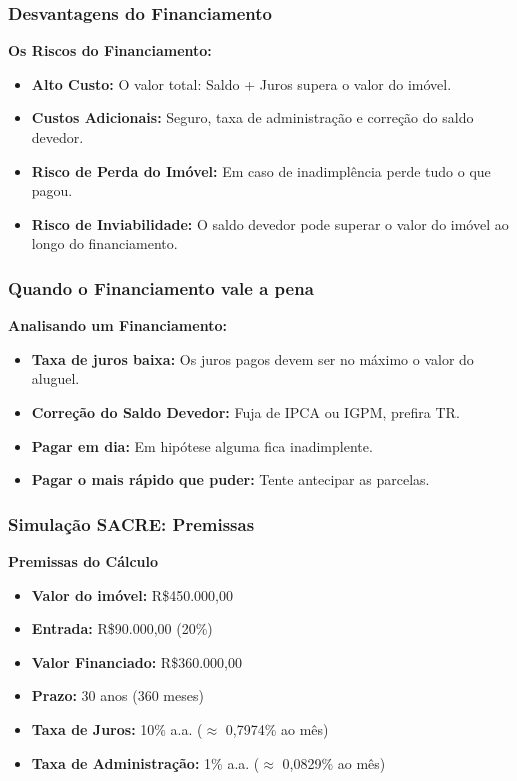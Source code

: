 \begin{frame}[c]\frametitle{Desvantagens do Financiamento}
  \textbf{Os Riscos do Financiamento:}
  \begin{itemize}
    \item \textbf{Alto Custo:} O valor total: Saldo + Juros supera o valor do imóvel.
    \item \textbf{Custos Adicionais:} Seguro, taxa de administração e correção do saldo devedor.
    \item \textbf{Risco de Perda do Imóvel:} Em caso de inadimplência perde tudo o que pagou.
    \item \textbf{Risco de Inviabilidade:} O saldo devedor pode superar o valor do imóvel ao longo do financiamento.
  \end{itemize}
\end{frame}

\begin{frame}[c]\frametitle{Quando o Financiamento vale a pena}
  \textbf{Analisando um Financiamento:}
  \begin{itemize}
    \item \textbf{Taxa de juros baixa:} Os juros pagos devem ser no máximo o valor do aluguel.
    \item \textbf{Correção do Saldo Devedor:} Fuja de IPCA ou IGPM, prefira TR.
    \item \textbf{Pagar em dia:} Em hipótese alguma fica inadimplente.
    \item \textbf{Pagar o mais rápido que puder:} Tente antecipar as parcelas.
  \end{itemize}
\end{frame}

\begin{frame}[c]\frametitle{Simulação SACRE: Premissas}
  \textbf{Premissas do Cálculo}
  \begin{itemize}
    \item \textbf{Valor do imóvel:} R\$450.000,00
    \item \textbf{Entrada:} R\$90.000,00 (20\%)
    \item \textbf{Valor Financiado:} R\$360.000,00
    \item \textbf{Prazo:} 30 anos (360 meses)
    \item \textbf{Taxa de Juros:} 10\% a.a. ($\approx$ 0,7974\% ao mês)
    \item \textbf{Taxa de Administração:} 1\% a.a. ($\approx$ 0,0829\% ao mês)
  \end{itemize}
\end{frame}

